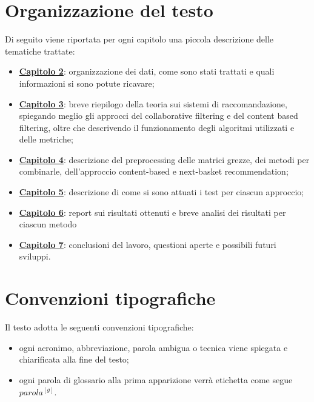 \section{Organizzazione del testo}
Di seguito viene riportata per ogni capitolo una piccola descrizione delle tematiche trattate:
\begin{itemize}
	\item \hyperlink{(chap:capitolo3)}{\textbf{Capitolo 2}}: organizzazione dei dati, come sono stati trattati e quali informazioni si sono potute ricavare;
	\item \hyperlink{(chap:capitolo4)}{\textbf{Capitolo 3}}: breve riepilogo della teoria sui sistemi di raccomandazione, spiegando meglio gli approcci del collaborative filtering e del content based filtering, oltre che descrivendo il funzionamento degli algoritmi utilizzati e delle metriche;
	\item \hyperlink{(chap:capitolo5)}{\textbf{Capitolo 4}}: descrizione del preprocessing delle matrici grezze, dei metodi per combinarle, dell'approccio content-based e next-basket recommendation;
	\item \hyperlink{(chap:capitolo5)}{\textbf{Capitolo 5}}: descrizione di come si sono attuati i test per ciascun approccio;
	\item \hyperlink{(chap:capitolo6)}{\textbf{Capitolo 6}}: report sui risultati ottenuti e breve analisi dei risultati per ciascun metodo
	\item \hyperlink{(chap:conclusioni)}{\textbf{Capitolo 7}}: conclusioni del lavoro, questioni aperte e possibili futuri sviluppi.
\end{itemize}
\section{Convenzioni tipografiche}
Il testo adotta le seguenti convenzioni tipografiche:
\begin{itemize}
	\item ogni acronimo, abbreviazione, parola ambigua o tecnica viene spiegata e chiarificata alla fine del testo;
	\item ogni parola di glossario alla prima apparizione verrà etichetta come segue $parola^{[g]}$.
\end{itemize}


































